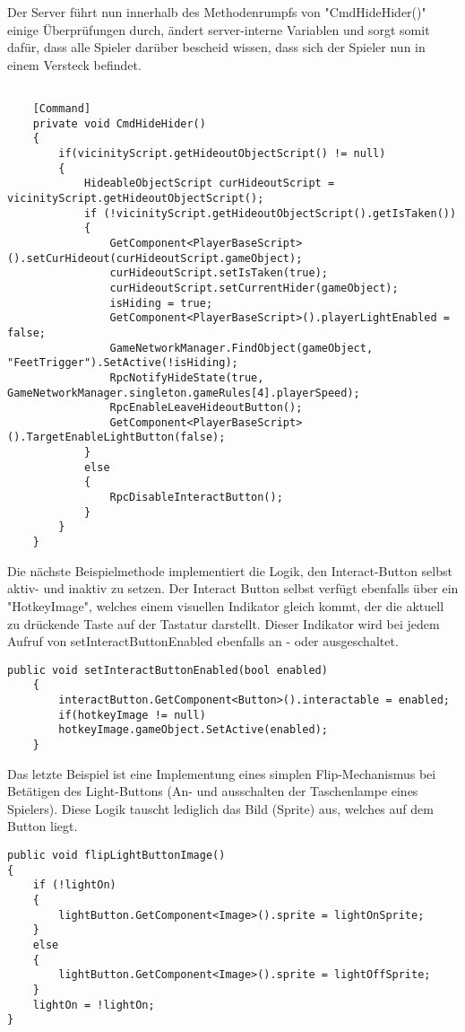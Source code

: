 Der Server führt nun innerhalb des Methodenrumpfs von "CmdHideHider()" einige Überprüfungen durch, ändert server-interne Variablen und sorgt somit dafür, dass alle Spieler darüber bescheid wissen, dass sich der Spieler nun in einem Versteck befindet.

\begin{lstlisting}[caption= HiderScript.cs Subscribe to InGameUiControllerScript Event]
	
	[Command]
	private void CmdHideHider()
	{
		if(vicinityScript.getHideoutObjectScript() != null)
		{
			HideableObjectScript curHideoutScript = vicinityScript.getHideoutObjectScript();
			if (!vicinityScript.getHideoutObjectScript().getIsTaken())
			{
				GetComponent<PlayerBaseScript>().setCurHideout(curHideoutScript.gameObject);
				curHideoutScript.setIsTaken(true);
				curHideoutScript.setCurrentHider(gameObject);
				isHiding = true;
				GetComponent<PlayerBaseScript>().playerLightEnabled = false;
				GameNetworkManager.FindObject(gameObject, "FeetTrigger").SetActive(!isHiding);
				RpcNotifyHideState(true, GameNetworkManager.singleton.gameRules[4].playerSpeed);
				RpcEnableLeaveHideoutButton();
				GetComponent<PlayerBaseScript>().TargetEnableLightButton(false);
			}
			else
			{
				RpcDisableInteractButton();
			}
		}
	}	
\end{lstlisting}

Die nächste Beispielmethode implementiert die Logik, den Interact-Button selbst aktiv- und inaktiv zu setzen. Der Interact Button selbst verfügt ebenfalls über ein "HotkeyImage", welches einem visuellen Indikator gleich kommt, der die aktuell zu drückende Taste auf der Tastatur darstellt. Dieser Indikator wird bei jedem Aufruf von setInteractButtonEnabled ebenfalls an - oder ausgeschaltet.

\begin{lstlisting}[caption= InGameUiControllerScript.cs setInteractButtonEnabled]
public void setInteractButtonEnabled(bool enabled)
	{
		interactButton.GetComponent<Button>().interactable = enabled;
		if(hotkeyImage != null)
		hotkeyImage.gameObject.SetActive(enabled);
	}
\end{lstlisting}

Das letzte Beispiel ist eine Implementung eines simplen Flip-Mechanismus bei Betätigen des Light-Buttons (An- und ausschalten der Taschenlampe eines Spielers). Diese Logik tauscht lediglich das Bild (Sprite) aus, welches auf dem Button liegt.

\begin{lstlisting}[caption= InGameUiControllerScript.cs flipLightButtonImage]
public void flipLightButtonImage()
{
	if (!lightOn)
	{
		lightButton.GetComponent<Image>().sprite = lightOnSprite;
	}
	else
	{
		lightButton.GetComponent<Image>().sprite = lightOffSprite;
	}
	lightOn = !lightOn;
}
\end{lstlisting}


